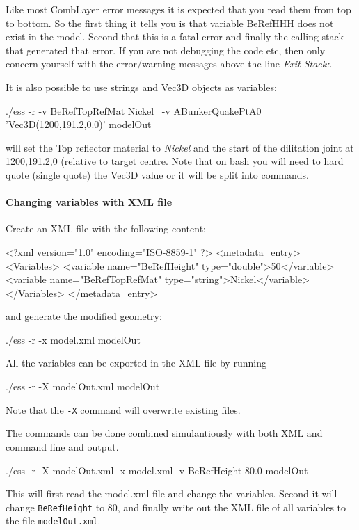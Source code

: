 Like most CombLayer error messages it is expected that you read them from top to bottom. So the first thing it tells you is
that variable BeRefHHH does not exist in the model. Second that this is a fatal error and finally the calling stack that generated
that error. If you are not debugging the code etc, then only concern yourself with the error/warning messages above the line {\it Exit Stack:}.


It is also possible to use strings and Vec3D objects as variables:
\begin{bash}
  ./ess -r -v BeRefTopRefMat Nickel \
           -v ABunkerQuakePtA0 'Vec3D(1200,191.2,0.0)' modelOut
\end{bash}

will set the Top reflector material to {\it Nickel} and the start of the dilitation joint at 1200,191.2,0 (relative to
target centre. Note that on bash you will need to hard quote (single quote) the Vec3D value or it will
be split into commands.


\paragraph[XML file]{Changing variables with XML file}
Create an XML file with the following content:

\begin{xml}
<?xml version="1.0" encoding="ISO-8859-1" ?>
<metadata_entry>
  <Variables>
  <variable name="BeRefHeight" type="double">50</variable>
  <variable name="BeRefTopRefMat" type="string">Nickel</variable>
  </Variables>
</metadata_entry>
\end{xml}

and generate the modified geometry:
\begin{bash}
  ./ess -r -x model.xml modelOut
\end{bash}

All the variables can be exported in the XML file by running
\begin{bash}
  ./ess -r -X modelOut.xml modelOut
\end{bash}
Note that the {\tt -X} command will overwrite existing files.

The commands can be done combined simulantiously with both XML and command line and output.
\begin{bash}
  ./ess -r -X modelOut.xml -x model.xml -v BeRefHeight 80.0 modelOut 
\end{bash}

This will first read the model.xml file and change the variables. Second it will
change {\tt BeRefHeight} to 80, and finally write out the XML file of all variables to the file
{\tt modelOut.xml}.

